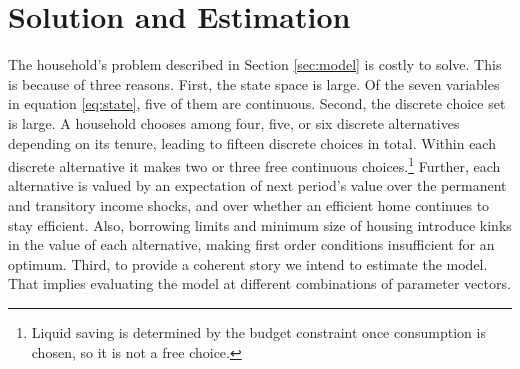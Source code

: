%
\section{Solution and Estimation}\label{sec:estimation}

The household's problem described in Section \ref{sec:model} is costly to solve. This is because of three reasons. First, the state space is large. Of the seven variables in equation \eqref{eq:state}, five of them are continuous. Second, the discrete choice set is large. A household chooses among four, five, or six discrete alternatives depending on its tenure, leading to fifteen discrete choices in total. Within each discrete alternative it makes two or three free continuous choices.\footnote{Liquid saving is determined by the budget constraint once consumption is chosen, so it is not a free choice.} Further, each alternative is valued by an expectation of next period's value over the permanent and transitory income shocks, and over whether an efficient home continues to stay efficient. Also, borrowing limits and minimum size of housing introduce kinks in the value of each alternative, making first order conditions insufficient for an optimum. Third, to provide a coherent story we intend to estimate the model. That implies evaluating the model at different combinations of parameter vectors. 


